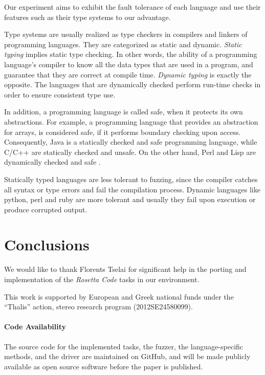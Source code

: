 \documentclass[10pt]{sigplanconf}
\begin{document}
Our experiment aims to exhibit the fault tolerance \cite{LYU95,KOKR07} of each language and use their features such as 
their type systems to our advantage. 

Type systems are usually realized as type checkers in compilers and linkers of programming languages. They are categorized as static and dynamic. \textit{Static typing} implies static type checking. In other words, the ability of a programming language's compiler to know all the data types that are used in a program, and guarantee that they are correct at compile time. \textit{Dynamic typing} is exactly the opposite. The languages that are dynamically checked perform run-time checks in order to ensure consistent type use. 

In addition, a programming language is called safe, when it protects its own abstractions. For example, a programming language that provides an abstraction for arrays, is considered safe, if it performs boundary checking upon access. Consequently, Java is a statically checked and safe programming language, while C/C++ are statically checked and unsafe. On the other hand, Perl and Lisp are dynamically checked and safe \cite{Pie02}.

Statically typed languages are less tolerant to fuzzing, since the compiler catches all syntax or type errors and fail the compilation process. Dynamic languages like python, perl and ruby are more tolerant and usually they fail upon execution or produce corrupted output.

\section{Conclusions} %
\label{sec:conclusions}


\acks

We would like to thank Florents Tselai for significant
help in the porting and implementation of the
{\em Rosetta Code} tasks in our environment.

This work is supported by European and Greek national funds
under the ``Thalis'' action, {\sc stereo} research program
(2012SE24580099).

\paragraph{Code Availability} The source code for
the implemented tasks,
the fuzzer,
the language-specific methods, and
the driver are maintained on GitHub, and
will be made publicly available as open source software
before the paper is published.








\end{document}
